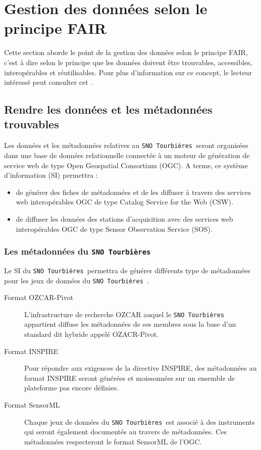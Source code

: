 \documentclass[]{article}
\newcommand{\mhref}[3][blue]{\href{#2}{\color{#1}{#3}}}%
\newcommand{\SNOT}{{\tt SNO~Tourbières }}
\begin{document}
\section{Gestion des données selon le principe \og{}FAIR\fg{}}
	
Cette section aborde le point de la gestion des données selon le principe \og{}FAIR\fg{}, c'est à dire selon le principe que les données doivent être trouvables, accessibles, interopérables et réutilisables. Pour plus d'information sur ce concept, le lecteur intéressé peut consulter cet \mhref{http://www.nature.com/articles/sdata201618}{article}.
	
\subsection{Rendre les données et les métadonnées trouvables}
	
Les données et les métadonnées relatives au \SNOT seront organisées dans une base de données relationnelle connectée à un moteur de génération de service web de type Open Geospatial Consortium (OGC). A terme, ce système d'information (SI) permettra :
\begin{itemize}
	\item de générer des fiches de métadonnées et de les diffuser à travers des services web interopérables OGC de type Catalog Service for the Web (CSW).
	\item de diffuser les données des stations d'acquisition avec des services web interopérables OGC de type Sensor Observation Service (SOS).
\end{itemize} 
	
\subsubsection{Les métadonnées du \SNOT}
	
Le SI du \SNOT permettra de générer différents type de métadonnées pour les jeux de données du \SNOT. 
	
\begin{description}
	\item[Format OZCAR-Pivot] L'infrastructure de recherche OZCAR auquel le \SNOT appartient diffuse les métadonnées de ses membres sous la base d'un standard dit hybride appelé \og{}OZACR-Pivot\fg{}.
	\item[Format INSPIRE] Pour répondre aux exigences de la directive INSPIRE, des métadonnées au format INSPIRE seront générées et moissonnées sur un ensemble de plateforme pas encore définies.
	\item[Format SensorML] Chaque jeux de données du \SNOT est associé à des instruments qui seront également documentés au travers de métadonnées. Ces métadonnées respecteront le format SensorML de l'OGC.
\end{description}
	
\end{document}
